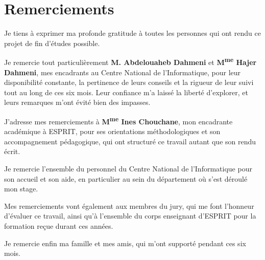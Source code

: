 \chapter*{Remerciements}

Je tiens à exprimer ma profonde gratitude à toutes les personnes qui ont rendu ce
projet de fin d'études possible.

Je remercie tout particulièrement \textbf{M. Abdelouaheb Dahmeni} et
\textbf{M\textsuperscript{me} Hajer Dahmeni}, mes encadrants au Centre National de
l'Informatique, pour leur disponibilité constante, la pertinence de leurs conseils et
la rigueur de leur suivi tout au long de ces six mois. Leur confiance m'a laissé la
liberté d'explorer, et leurs remarques m'ont évité bien des impasses.

J'adresse mes remerciements à \textbf{M\textsuperscript{me} Ines Chouchane}, mon
encadrante académique à ESPRIT, pour ses orientations méthodologiques et son
accompagnement pédagogique, qui ont structuré ce travail autant que son rendu écrit.

Je remercie l'ensemble du personnel du Centre National de l'Informatique pour son
accueil et son aide, en particulier au sein du département où s'est déroulé mon stage.

Mes remerciements vont également aux membres du jury, qui me font l'honneur d'évaluer
ce travail, ainsi qu'à l'ensemble du corps enseignant d'ESPRIT pour la formation reçue
durant ces années.

Je remercie enfin ma famille et mes amis, qui m'ont supporté pendant ces six mois.

\vspace{1cm}
